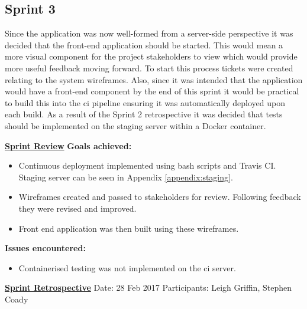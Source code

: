 \subsection{Sprint 3}
Since the application was now well-formed from a server-side perspective it was decided that the front-end application should be started. This would mean a more visual component for the project stakeholders to view which would provide more useful feedback moving forward. To start this process tickets were created relating to the system wireframes. Also, since it was intended that the application would have a front-end component by the end of this sprint it would be practical to build this into the \gls{ci} pipeline ensuring it was automatically deployed upon each build. As a result of the Sprint 2 retrospective it was decided that tests should be implemented on the staging server within a \gls{Docker container}.

\underline{\textbf{Sprint Review}}\newline
\textbf{Goals achieved:}
\begin{itemize}
	\item Continuous deployment implemented using bash scripts and Travis CI. Staging server can be seen in Appendix \ref{appendix:staging}.
	\item Wireframes created and passed to stakeholders for review. Following feedback they were revised and improved.
	\item Front end application was then built using these wireframes.
\end{itemize}

\textbf{Issues encountered:}
\begin{itemize}
	\item Containerised testing was not implemented on the \gls{ci} server.
\end{itemize}

\underline{\textbf{Sprint Retrospective}}\newline
Date: 28 Feb 2017\newline
Participants: Leigh Griffin, Stephen Coady

